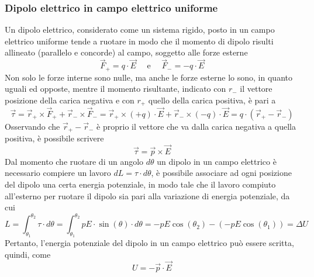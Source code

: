 \documentclass[a4paper]{extarticle}
\begin{document}
\subsubsection{Dipolo elettrico in campo elettrico uniforme}
Un dipolo elettrico, considerato come un sistema rigido, posto in un campo elettrico uniforme tende a ruotare in modo che il momento di dipolo risulti allineato (parallelo e concorde) al campo, soggetto alle forze esterne
\[\vec{F}_+ = q \cdot \vec E \hspace{1em} \text{ e } \hspace{1em} \vec{F}_- = -q \cdot \vec E\]
Non solo le forze interne sono nulle, ma anche le forze esterne lo sono, in quanto uguali ed opposte, mentre il momento risultante, indicato con $r_-$ il vettore posizione della carica negativa e con $r_+$ quello della carica positiva, è pari a
\[\vec \tau = \vec{r}_+ \times \vec{F}_+ + \vec{r}_- \times \vec{F}_- = \vec{r}_+ \times (+q) \cdot \vec {E} + \vec{r}_- \times (-q) \cdot \vec E = q \cdot (\vec{r}_+ - \vec{r}_-)\]
Osservando che $\vec{r}_+-\vec{r}_-$ è proprio il vettore che va dalla carica negativa a quella positiva, è possibile scrivere
\[\boxed{\vec \tau = \vec{p} \times \vec{E}}\]
Dal momento che ruotare di un angolo $d \theta$ un dipolo in un campo elettrico è necessario compiere un lavoro $dL = \tau \cdot d \theta$, è possibile associare ad ogni posizione del dipolo una certa energia potenziale, in modo tale che il lavoro compiuto all'esterno per ruotare il dipolo sia pari alla variazione di energia potenziale, da cui
\[L = \int_{\theta_1}^{\theta_2} \tau \cdot d\theta = \int_{\theta_1}^{\theta_2} pE \cdot \sin(\theta) \cdot d\theta = - p E \cos(\theta_2) - (- p E \cos(\theta_1)) = \Delta U\]
Pertanto, l'energia potenziale del dipolo in un campo elettrico può essere scritta, quindi, come
\[\boxed{U = - \vec{p} \cdot \vec{E}}\]
\end{document}
